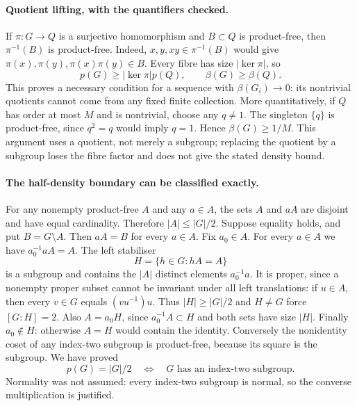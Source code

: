 \documentclass[11pt,a4paper]{article}
\begin{document}
\paragraph{Quotient lifting, with the quantifiers checked.}
If $\pi:G\to Q$ is a surjective homomorphism and $B\subset Q$ is product-free, then $\pi^{-1}(B)$ is product-free. Indeed, $x,y,xy\in\pi^{-1}(B)$ would give $\pi(x),\pi(y),\pi(x)\pi(y)\in B$. Every fibre has size $|\ker\pi|$, so
\[
 p(G)\geq |\ker\pi|p(Q),\qquad \beta(G)\geq\beta(Q).
\]
This proves a necessary condition for a sequence with $\beta(G_i)\to0$: its nontrivial quotients cannot come from any fixed finite collection. More quantitatively, if $Q$ has order at most $M$ and is nontrivial, choose any $q\ne1$. The singleton $\{q\}$ is product-free, since $q^2=q$ would imply $q=1$. Hence $\beta(G)\geq1/M$. This argument uses a quotient, not merely a subgroup; replacing the quotient by a subgroup loses the fibre factor and does not give the stated density bound.

\paragraph{The half-density boundary can be classified exactly.}
For any nonempty product-free $A$ and any $a\in A$, the sets $A$ and $aA$ are disjoint and have equal cardinality. Therefore $|A|\leq |G|/2$. Suppose equality holds, and put $B=G\setminus A$. Then $aA=B$ for every $a\in A$. Fix $a_0\in A$. For every $a\in A$ we have $a_0^{-1}aA=A$. The left stabiliser
\[
 H=\{h\in G:hA=A\}
\]
is a subgroup and contains the $|A|$ distinct elements $a_0^{-1}a$. It is proper, since a nonempty proper subset cannot be invariant under all left translations: if $u\in A$, then every $v\in G$ equals $(vu^{-1})u$. Thus $|H|\geq |G|/2$ and $H\ne G$ force $[G:H]=2$. Also $A=a_0H$, since $a_0^{-1}A\subset H$ and both sets have size $|H|$. Finally $a_0\notin H$: otherwise $A=H$ would contain the identity. Conversely the nonidentity coset of any index-two subgroup is product-free, because its square is the subgroup. We have proved
\[
 p(G)=|G|/2\quad\Longleftrightarrow\quad G\text{ has an index-two subgroup}.
\]
Normality was not assumed: every index-two subgroup is normal, so the converse multiplication is justified.
\end{document}
